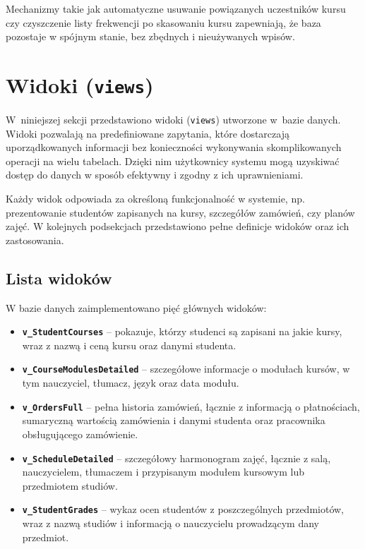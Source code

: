 \documentclass[12pt]{article}
\begin{document}
\noindent Mechanizmy takie jak automatyczne usuwanie powiązanych uczestników kursu czy czyszczenie listy frekwencji po skasowaniu kursu zapewniają, że baza pozostaje w spójnym stanie, bez zbędnych i nieużywanych wpisów.



\newpage
\section{Widoki (\texttt{views})}
\label{sec:views}

\noindent W~niniejszej sekcji przedstawiono widoki (\texttt{views}) utworzone w~bazie danych.  
Widoki pozwalają na predefiniowane zapytania, które dostarczają uporządkowanych informacji bez konieczności wykonywania skomplikowanych operacji na wielu tabelach.  
Dzięki nim użytkownicy systemu mogą uzyskiwać dostęp do danych w sposób efektywny i zgodny z ich uprawnieniami.

\noindent Każdy widok odpowiada za określoną funkcjonalność w systemie, np. prezentowanie studentów zapisanych na kursy, szczegółów zamówień, czy planów zajęć. W kolejnych podsekcjach przedstawiono pełne definicje widoków oraz ich zastosowania.

\subsection{Lista widoków}

W bazie danych zaimplementowano pięć głównych widoków:

\begin{itemize}
    \item \textbf{\texttt{v\_StudentCourses}} – pokazuje, którzy studenci są zapisani na jakie kursy, wraz z nazwą i ceną kursu oraz danymi studenta.
    \item \textbf{\texttt{v\_CourseModulesDetailed}} – szczegółowe informacje o modułach kursów, w tym nauczyciel, tłumacz, język oraz data modułu.
    \item \textbf{\texttt{v\_OrdersFull}} – pełna historia zamówień, łącznie z informacją o płatnościach, sumaryczną wartością zamówienia i danymi studenta oraz pracownika obsługującego zamówienie.
    \item \textbf{\texttt{v\_ScheduleDetailed}} – szczegółowy harmonogram zajęć, łącznie z salą, nauczycielem, tłumaczem i przypisanym modułem kursowym lub przedmiotem studiów.
    \item \textbf{\texttt{v\_StudentGrades}} – wykaz ocen studentów z poszczególnych przedmiotów, wraz z nazwą studiów i informacją o nauczycielu prowadzącym dany przedmiot.
\end{itemize}
\end{document}
